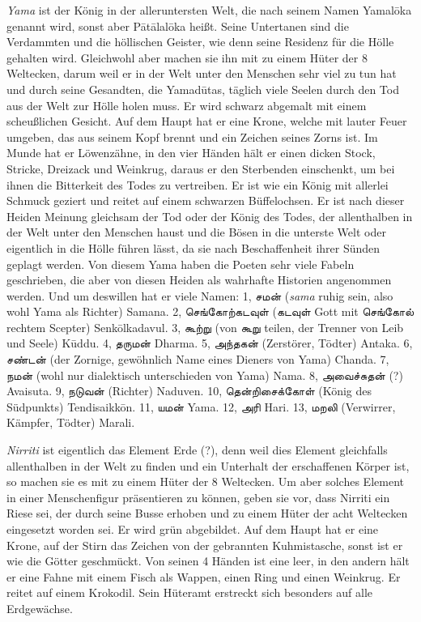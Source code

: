 \documentclass{article}
\newcommand{\TamilText}[1]{\texttamil{#1}}
\newcommand{\tam}[1]{\TamilText{#1}}
\begin{document}
\emph{Yama} ist der König in der alleruntersten Welt, die nach seinem Namen Yamal\={o}ka genannt wird, sonst aber P\={a}t\={a}lal\={o}ka heißt. Seine Untertanen sind die Verdammten und die höllischen Geister, wie denn seine Residenz für die Hölle gehalten wird. Gleichwohl aber machen sie ihn mit zu einem Hüter der 8 Weltecken, darum weil er in der Welt unter den Menschen sehr viel zu tun hat und durch seine Gesandten, die Yamad\={u}tas, täglich viele Seelen durch den Tod aus der Welt zur Hölle holen muss. Er wird schwarz abgemalt mit einem scheußlichen Gesicht. Auf dem Haupt hat er eine Krone, welche mit lauter Feuer umgeben, das aus seinem Kopf brennt und ein Zeichen seines Zorns ist. Im Munde hat er Löwenzähne, in den vier Händen hält er einen dicken Stock, Stricke, Dreizack und Weinkrug, daraus er den Sterbenden einschenkt, um bei ihnen die Bitterkeit des Todes zu vertreiben. Er ist wie ein König mit allerlei Schmuck geziert und reitet auf einem schwarzen Büffelochsen. Er ist nach dieser Heiden Meinung gleichsam der Tod oder der König des Todes, der allenthalben in der Welt unter den Menschen haust und die Bösen in die unterste Welt oder eigentlich in die Hölle führen lässt, da sie nach Beschaffenheit ihrer Sünden geplagt werden. Von diesem Yama haben die Poeten sehr viele Fabeln geschrieben, die aber von diesen Heiden als wahrhafte Historien angenommen werden. Und um deswillen hat er viele Namen: 1, \tam{சமன்} (\emph{sama} ruhig sein, also wohl Yama als Richter) Samana. 2, \tam{செங்கோற்கடவுள்} (\tam{கடவுள்} Gott mit \tam{செங்கோல்} rechtem Scepter) Senk\={o}lkadavul. 3, \tam{கூற்று} (von \tam{கூறு} teilen, der Trenner von Leib und Seele) K\={u}ddu. 4, \tam{தருமன்} Dharma. 5, \tam{அந்தகன்} (Zerstörer, Tödter) Antaka. 6, \tam{சண்டன்} (der Zornige, gewöhnlich Name eines Dieners von Yama) Chanda. 7, \tam{நமன்} (wohl nur dialektisch unterschieden von Yama) Nama. 8, \tam{அவைச்சுதன்} (?) Avaisuta. 9, \tam{நடுவன்} (Richter) Naduven. 10, \tam{தென்றிசைக்கோள்} (König des Südpunkts) Tendisaikk\={o}n. 11, \tam{யமன்} Yama. 12, \tam{அரி} Hari. 13, \tam{மறலி} (Verwirrer, Kämpfer, Tödter) Marali.

\emph{Nirriti} ist eigentlich das Element Erde (?), denn weil dies Element gleichfalls allenthalben in der Welt zu finden und ein Unterhalt der erschaffenen Körper ist, so machen sie es mit zu einem Hüter der 8 Weltecken. Um aber solches Element in einer Menschenfigur präsentieren zu können, geben sie vor, dass Nirriti ein Riese sei, der durch seine Busse erhoben und zu einem Hüter der acht Weltecken eingesetzt worden sei. Er wird grün abgebildet. Auf dem Haupt hat er eine Krone, auf der Stirn das Zeichen von der gebrannten Kuhmistasche, sonst ist er wie die Götter geschmückt. Von seinen 4 Händen ist eine leer, in den andern hält er eine Fahne mit einem Fisch als Wappen, einen Ring und einen Weinkrug. Er reitet auf einem Krokodil. Sein Hüteramt erstreckt sich besonders auf alle Erdgewächse.
\end{document}

